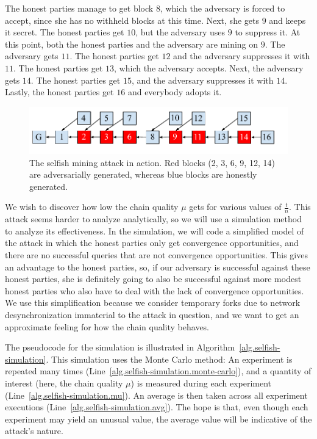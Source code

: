 The honest parties manage to get block $8$, which the adversary is forced to accept, since she
has no withheld blocks at this time. Next, she gets $9$ and keeps it secret. The honest parties
get $10$, but the adversary uses $9$ to suppress it. At this point, both the honest parties
and the adversary are mining on $9$. The adversary gets $11$. The honest parties get $12$ and
the adversary suppresses it with $11$. The honest parties get $13$, which the adversary accepts.
Next, the adversary gets $14$. The honest parties get $15$, and the adversary suppresses it with
$14$. Lastly, the honest parties get $16$ and everybody adopts it.

\begin{figure}[h]
    \centering
    \includegraphics[width=\columnwidth,keepaspectratio]{figures/selfish-mining.pdf}
    \caption{The selfish mining attack in action. Red blocks (2, 3, 6, 9, 12, 14) are adversarially
             generated, whereas blue blocks are honestly generated.}
    \label{fig.selfish-mining}
\end{figure}

We wish to discover how low the chain quality $\mu$ gets for various values of
$\frac{t}{n}$. This attack seems harder to analyze analytically, so we will use a simulation
method to analyze its effectiveness. In the simulation, we will code a simplified model of the attack
in which the honest parties only get convergence opportunities, and there are no successful queries
that are not convergence opportunities. This gives an advantage
to the honest parties, so, if our adversary is successful against these honest
parties, she is definitely going to also be successful against more modest honest parties
who also have to deal with the lack of convergence opportunities. We use this simplification
because we consider temporary forks due to network desynchronization immaterial to the attack in
question, and we want to get an approximate feeling for how the chain quality behaves.

The pseudocode for the simulation is illustrated in Algorithm~\ref{alg.selfish-simulation}.
This simulation uses the Monte Carlo method: An experiment is repeated many times
(Line~\ref{alg.selfish-simulation.monte-carlo}),
and a quantity of interest (here, the chain quality $\mu$) is measured during each experiment
(Line~\ref{alg.selfish-simulation.mu}). An average
is then taken across all experiment executions
(Line~\ref{alg.selfish-simulation.avg}). The hope is that, even though each experiment may
yield an unusual value, the average value will be indicative of the attack's nature.

